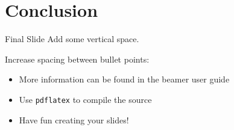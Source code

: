 \documentclass[10pt,t]{beamer}
\begin{document}
\section{Conclusion}


\begin{frame}{Final Slide}
    Add some vertical space.

    \vspace{8mm}
    Increase spacing between bullet points:

    \vspace{5mm}
\begin{itemize}\addtolength{\itemsep}{5mm}
        \item More information can be found in the \alert{beamer user guide}
        \item Use \texttt{pdflatex} to compile the source
        \item Have fun creating your slides!
\end{itemize}
\end{frame}
\end{document}
